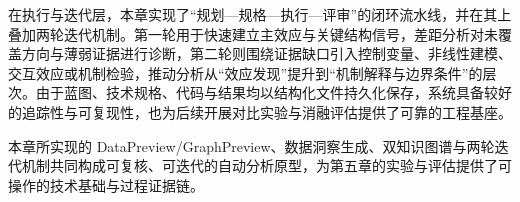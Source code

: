 在执行与迭代层，本章实现了“规划—规格—执行—评审”的闭环流水线，并在其上叠加两轮迭代机制。第一轮用于快速建立主效应与关键结构信号，差距分析对未覆盖方向与薄弱证据进行诊断，第二轮则围绕证据缺口引入控制变量、非线性建模、交互效应或机制检验，推动分析从“效应发现”提升到“机制解释与边界条件”的层次。由于蓝图、技术规格、代码与结果均以结构化文件持久化保存，系统具备较好的追踪性与可复现性，也为后续开展对比实验与消融评估提供了可靠的工程基座。

本章所实现的 DataPreview/GraphPreview、数据洞察生成、双知识图谱与两轮迭代机制共同构成可复核、可迭代的自动分析原型，为第五章的实验与评估提供了可操作的技术基础与过程证据链。
